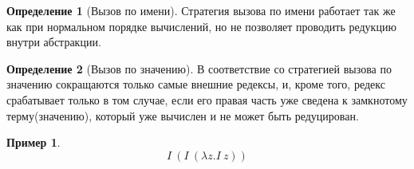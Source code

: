 \documentclass[10pt,twoside]{article}
\theoremstyle{plain}
\newtheorem{thm}{Теорема}
\newtheorem{corol}{Следствие}
\newtheorem{ass}{Утверждение}
\theoremstyle{definition}
\newtheorem{defi}{Определение}
\newtheorem*{example}{Пример}
\begin{document}
\begin{defi}[Вызов по имени]
  Стратегия вызова по имени работает так же как при нормальном порядке вычислений, но не позволяет проводить редукцию внутри абстракции.
\end{defi}

\begin{defi}[Вызов по значению]
  В соответствие со стратегией вызова по значению сокращаются только самые внешние редексы, и, кроме того, редекс срабатывает только в том случае, если его правая часть уже сведена к замкнотому терму(значению), который уже вычислен и не может быть редуцирован.
\end{defi}

\begin{example}
  $$I\ (I\ (\lambda z.I\ z))$$
\end{example}

%
%

%
%
\end{document}
